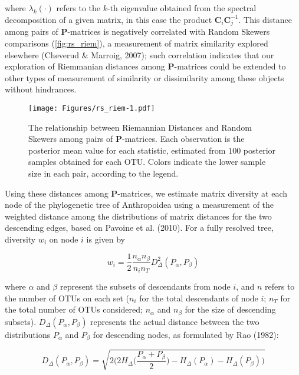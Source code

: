 \documentclass[12pt,twoside]{report}
\begin{document}
where $\lambda_k(\cdot)$ refers to the $k$-th eigenvalue obtained from
the spectral decomposition of a given matrix, in this case the product
$\mathbf{C}_i\mathbf{C}_j^{-1}$. This distance among pairs of
$\mathbf{P}$-matrices is negatively correlated with Random Skewers
comparisons (\autoref{fig:rs_riem}), a measurement of matrix similarity
explored elsewhere (Cheverud \& Marroig, 2007); such correlation
indicates that our exploration of Riemmanian distances among
$\mathbf{P}$-matrices could be extended to other types of measurement of
similarity or dissimilarity among these objects without hindrances.

\begin{figure}[htbp]
\centering
\texttt{[image: Figures/rs\_riem-1.pdf]}
\caption{The relationship between Riemannian Distances and Random
Skewers among pairs of $\mathbf{P}$-matrices. Each observation is the
posterior mean value for each statistic, estimated from $100$ posterior
samples obtained for each OTU. Colors indicate the lower sample size in
each pair, according to the legend. \label{fig:rs_riem}}
\end{figure}

Using these distances among $\mathbf{P}$-matrices, we estimate matrix
diversity at each node of the phylogenetic tree of Anthropoidea using a
measurement of the weighted distance among the distributions of matrix
distances for the two descending edges, based on Pavoine et al. (2010).
For a fully resolved tree, diversity $w_i$ on node $i$ is given by

\begin{equation}
w_i = \frac{1}{2} \frac{n_\alpha n_\beta} {n_i n_T} D_{\Delta}^2(P_\alpha, P_\beta)
\label{eq:div}
\end{equation}

where $\alpha$ and $\beta$ represent the subsets of descendants from
node $i$, and $n$ refers to the number of OTUs on each set ($n_i$ for
the total descendants of node $i$; $n_T$ for the total number of OTUs
considered; $n_\alpha$ and $n_\beta$ for the size of descending
subsets). $D_{\Delta}(P_\alpha, P_\beta)$ represents the actual distance
between the two distributions $P_\alpha$ and $P_\beta$ for descending
nodes, as formulated by Rao (1982):

\begin{equation}
D_{\Delta} (P_\alpha, P_\beta) =
\sqrt{2 \bigg( 2 H_{\Delta} \bigg( \frac{P_\alpha + P_\beta}{2} \bigg) -
H_{\Delta}(P_\alpha) - H_{\Delta}(P_\beta) \bigg)}
\label{eq:distdist}
\end{equation}
\end{document}
